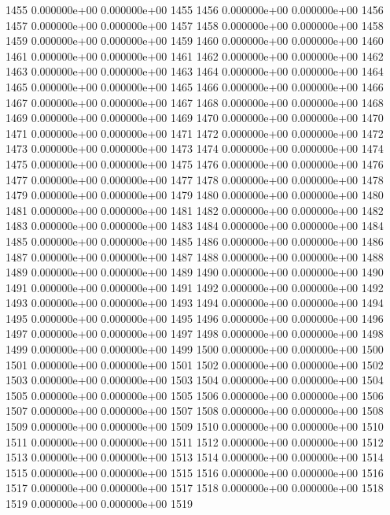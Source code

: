 \documentclass{article}
\begin{document}
\begin{Schunk}
\begin{Soutput}
1455   0.000000e+00   0.000000e+00 1455
1456   0.000000e+00   0.000000e+00 1456
1457   0.000000e+00   0.000000e+00 1457
1458   0.000000e+00   0.000000e+00 1458
1459   0.000000e+00   0.000000e+00 1459
1460   0.000000e+00   0.000000e+00 1460
1461   0.000000e+00   0.000000e+00 1461
1462   0.000000e+00   0.000000e+00 1462
1463   0.000000e+00   0.000000e+00 1463
1464   0.000000e+00   0.000000e+00 1464
1465   0.000000e+00   0.000000e+00 1465
1466   0.000000e+00   0.000000e+00 1466
1467   0.000000e+00   0.000000e+00 1467
1468   0.000000e+00   0.000000e+00 1468
1469   0.000000e+00   0.000000e+00 1469
1470   0.000000e+00   0.000000e+00 1470
1471   0.000000e+00   0.000000e+00 1471
1472   0.000000e+00   0.000000e+00 1472
1473   0.000000e+00   0.000000e+00 1473
1474   0.000000e+00   0.000000e+00 1474
1475   0.000000e+00   0.000000e+00 1475
1476   0.000000e+00   0.000000e+00 1476
1477   0.000000e+00   0.000000e+00 1477
1478   0.000000e+00   0.000000e+00 1478
1479   0.000000e+00   0.000000e+00 1479
1480   0.000000e+00   0.000000e+00 1480
1481   0.000000e+00   0.000000e+00 1481
1482   0.000000e+00   0.000000e+00 1482
1483   0.000000e+00   0.000000e+00 1483
1484   0.000000e+00   0.000000e+00 1484
1485   0.000000e+00   0.000000e+00 1485
1486   0.000000e+00   0.000000e+00 1486
1487   0.000000e+00   0.000000e+00 1487
1488   0.000000e+00   0.000000e+00 1488
1489   0.000000e+00   0.000000e+00 1489
1490   0.000000e+00   0.000000e+00 1490
1491   0.000000e+00   0.000000e+00 1491
1492   0.000000e+00   0.000000e+00 1492
1493   0.000000e+00   0.000000e+00 1493
1494   0.000000e+00   0.000000e+00 1494
1495   0.000000e+00   0.000000e+00 1495
1496   0.000000e+00   0.000000e+00 1496
1497   0.000000e+00   0.000000e+00 1497
1498   0.000000e+00   0.000000e+00 1498
1499   0.000000e+00   0.000000e+00 1499
1500   0.000000e+00   0.000000e+00 1500
1501   0.000000e+00   0.000000e+00 1501
1502   0.000000e+00   0.000000e+00 1502
1503   0.000000e+00   0.000000e+00 1503
1504   0.000000e+00   0.000000e+00 1504
1505   0.000000e+00   0.000000e+00 1505
1506   0.000000e+00   0.000000e+00 1506
1507   0.000000e+00   0.000000e+00 1507
1508   0.000000e+00   0.000000e+00 1508
1509   0.000000e+00   0.000000e+00 1509
1510   0.000000e+00   0.000000e+00 1510
1511   0.000000e+00   0.000000e+00 1511
1512   0.000000e+00   0.000000e+00 1512
1513   0.000000e+00   0.000000e+00 1513
1514   0.000000e+00   0.000000e+00 1514
1515   0.000000e+00   0.000000e+00 1515
1516   0.000000e+00   0.000000e+00 1516
1517   0.000000e+00   0.000000e+00 1517
1518   0.000000e+00   0.000000e+00 1518
1519   0.000000e+00   0.000000e+00 1519

\end{Soutput}
\end{Schunk}
\end{document}
